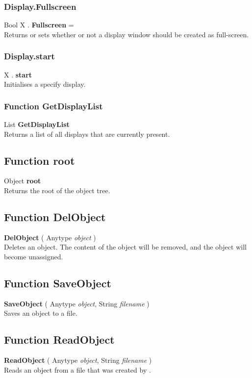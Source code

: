 \subsubsection{Display.Fullscreen \label{F:Display:Fullscreen}}
Bool X . \textbf{Fullscreen} = \\
Returns or sets whether or not a display window should be created as full-screen.


\subsubsection{Display.start \label{F:Display:start}}
X . \textbf{start} \\
Initialises a specify display.

\subsubsection{Function GetDisplayList \label{F:GetDisplayList}}
List \textbf{GetDisplayList} \\
Returns a list of all displays that are currently present.

\subsection{Function root \label{F:root}}
Object \textbf{root} \\
Returns the root of the object tree.

\subsection{Function DelObject \label{F:DelObject}}
\textbf{DelObject} ( Anytype \textit{object} ) \\
Deletes an object. The content of the object will be removed, and the object will become unassigned.

\subsection{Function SaveObject \label{F:SaveObject}}
\textbf{SaveObject} ( Anytype \textit{object}, String \textit{filename} ) \\
Saves an object to a file.

\subsection{Function ReadObject \label{F:ReadObject}}
\textbf{ReadObject} ( Anytype \textit{object}, String \textit{filename} ) \\
Reads an object from a file that was created by .

